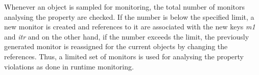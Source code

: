 {\begin{center}
\begin{lstlisting}
\end{lstlisting}
\end{center}


Whenever an object is sampled for monitoring, the total number of monitors 
analysing the property are checked. If the number is below the specified limit, 
a new monitor is created and references to it are associated with the new keys 
\textit{m1} and \textit{itr} and on the other hand, if the number exceeds the 
limit, the previously generated monitor is reassigned for the current objects by 
changing the references. Thus, a limited set of monitors is used for analysing 
the property violations as done in runtime monitoring. 
}














